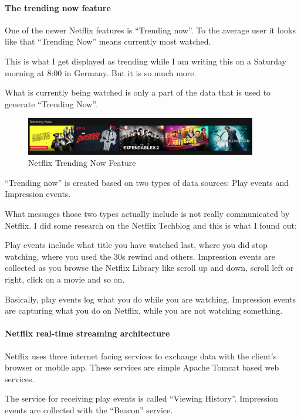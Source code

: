 \documentclass[12pt, numbers=noenddot]{scrreprt} %
\begin{document}
\paragraph{The trending now feature}
One of the newer Netflix features is “Trending now”. To the average user it looks like that “Trending Now” means currently most watched.

This is what I get displayed as trending while I am writing this on a Saturday morning at 8:00 in Germany. But it is so much more.

What is currently being watched is only a part of the data that is used to generate “Trending Now”.

\begin{figure}[htbp]
  \centering
     \includegraphics[width=0.9\textwidth]{images/Netflix-Trending-Now-Screenshot.png}
  \caption{Netflix Trending Now Feature}
  \label{fig:Bild1}
\end{figure}

“Trending now” is created based on two types of data sources: Play events and Impression events.

What messages those two types actually include is not really communicated by Netflix. I did some research on the Netflix Techblog and this is what I found out:

Play events include what title you have watched last, where you did stop watching, where you used the 30s rewind and others.
Impression events are collected as you browse the Netflix Library like scroll up and down, scroll left or right, click on a movie and so on.

Basically, play events log what you do while you are watching. Impression events are capturing what you do on Netflix, while you are not watching something.

\paragraph{Netflix real-time streaming architecture}
Netflix uses three internet facing services to exchange data with the client’s browser or mobile app. These services are simple Apache Tomcat based web services.

The service for receiving play events is called “Viewing History”. Impression events are collected with the “Beacon” service.
\end{document}
